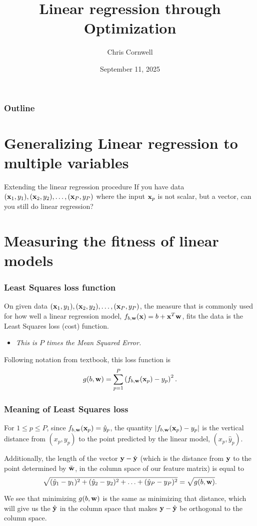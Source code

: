 \documentclass{beamer}
\author{Chris Cornwell}
\date{September 11, 2025}
\title{Linear regression through Optimization}
\theoremstyle{example}
\begin{document}
\begin{frame}
\titlepage
\end{frame}

\begin{frame}
\frametitle{Outline}
\tableofcontents
\end{frame}

\section{Generalizing Linear regression to multiple variables}

\begin{frame}{Extending the linear regression procedure}
    If you have data $({\bf x}_1,y_1), ({\bf x}_2,y_2), \ldots, ({\bf x}_P, y_P)$ where the input ${\bf x}_p$ is not scalar, but a vector, can you still do linear regression?
\end{frame}

\section{Measuring the fitness of linear models}

\begin{frame}
    \frametitle{Least Squares loss function}
    On given data $({\bf x}_1, y_1), ({\bf x}_2, y_2), \ldots, ({\bf x}_P, y_P)$, the measure that is commonly used for how well a linear regression model, $f_{b,{\bf w}}({\bf x}) = b + {\bf x}^T{\bf w}$, fits the data is the Least Squares loss (cost) function. 
    \vspace*{-8pt}
    \begin{itemize}
        \item \textit{This is $P$ times the Mean Squared Error.}
    \end{itemize}

    Following notation from textbook, this loss function is 
        \[g(b, {\bf w}) = \sum_{p=1}^P\left(f_{b,{\bf w}}({\bf x}_p) - y_p\right)^2.\]
    
\end{frame}

\begin{frame}
    \frametitle{Meaning of Least Squares loss}
    For $1\le p\le P$, since $f_{b,{\bf w}}({\bf x}_p) = \hat{y}_p$, the quantity $|f_{b,{\bf w}}({\bf x}_p) - y_p|$ is the vertical distance from $(x_p, y_p)$ to the point predicted by the linear model, $(x_p, \hat{y}_p)$. 

    Additionally, the length of the vector ${\bf y} - \hat{\bf y}$ (which is the distance from ${\bf y}$ to the point determined by $\tilde{\bf w}$, in the column space of our feature matrix) is equal to 
        \[\sqrt{(\hat{y}_1 - y_1)^2 + (\hat{y}_2 - y_2)^2 + \ldots + (\hat{y}_P - y_P)^2} = \sqrt{g(b, {\bf w})}.\]

    We see that minimizing $g(b, {\bf w})$ is the same as minimizing that distance, which will give us the $\hat{\bf y}$ in the column space that makes ${\bf y} - \hat{\bf y}$ be orthogonal to the column space.
\end{frame}
\end{document}
